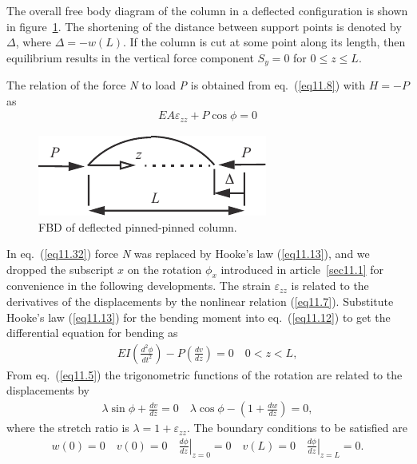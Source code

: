 \documentclass{AeroStructure-ERJohnson}
\begin{document}
The overall free body diagram of the column in a deflected configuration is shown in figure~\ref{fig11.7}. The shortening of the distance between support points is denoted by $ \Delta $, where $ \Delta=-w(L) $. If the column is cut at some point along its length, then equilibrium results in the vertical force component $ S_{y}=0$ for $0 \leq z \leq L$.

The relation of the force \textit{N} to load \textit{P} is obtained from eq.~(\ref{eq11.8}) with $ H=-P $ as
\begin{align}
E A \varepsilon_{z z}+P \cos \phi=0 \label{eq11.32}
\end{align}

\begin{figure}
\includegraphics{Figure_11-7.pdf}
\caption{FBD of deflected pinned-pinned column. \label{fig11.7}}
\end{figure}

\noindent In eq.~(\ref{eq11.32}) force \textit{N} was replaced by Hooke's law (\ref{eq11.13}), and we dropped the subscript $x$ on the rotation $ \phi_{x} $ introduced in article~\ref{sec11.1} for convenience in the following developments. The strain $ \varepsilon_{z z} $ is related to the derivatives of the displacements by the nonlinear relation (\ref{eq11.7}). Substitute Hooke's law (\ref{eq11.13}) for the bending moment into eq.~(\ref{eq11.12}) to get the differential equation for bending as
\begin{align}\label{eq11.33}
 E I\left(\frac{d^{2} \phi}{d t^{2}}\right)-P\left(\frac{d v}{d z}\right)=0 \quad 0<z<L ,
\end{align}
From eq.~(\ref{eq11.5}) the trigonometric functions of the rotation are related to the displacements by
\begin{align}\label{eq11.34}
 \lambda \sin \phi+\frac{d v}{d z}=0 \quad \lambda \cos \phi-\left(1+\frac{d w}{d z}\right)=0 ,
\end{align}
where the stretch ratio is $ \lambda=1+\varepsilon_{z z} $. The boundary conditions to be satisfied are
\begin{align}\label{eq11.35}
 w(0)=0 \quad v(0)=\left.0 \quad \frac{d \phi}{d z}\right|_{z=0}=0 \quad v(L)=\left.0 \quad \frac{d \phi}{d z}\right|_{z=L}=0.
\end{align}
\end{document}
